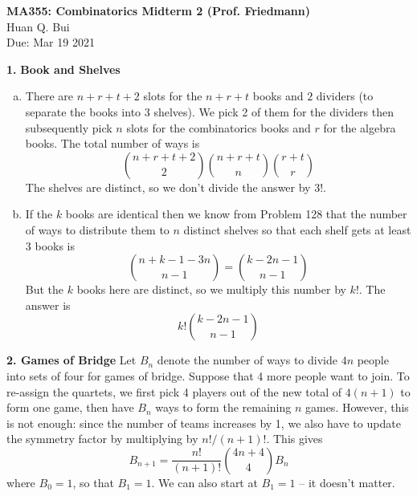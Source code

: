 \documentclass[11pt]{article}
\newcommand{\f}[2]{\frac{#1}{#2}}
\begin{document}
	\begin{framed}
\begin{center}
{\large \bf MA355: Combinatorics Midterm 2 (Prof. Friedmann)}\\
{ Huan Q. Bui}\\
Due: Mar 19 2021
\end{center}
\end{framed}







\noindent \textbf{1.} \textbf{Book and Shelves}
\begin{enumerate}[(a)]
	\item There are $n+r+t+2$ slots for the $n+r+t$ books and $2$ dividers (to separate the books into 3 shelves). We pick 2 of them for the dividers then subsequently pick $n$ slots for the combinatorics books and $r$ for the algebra books. The total number of ways is
	\begin{equation*}
	\boxed{{ n+r+t+2\choose{2}} { n+r+t\choose{n} }{ r+t\choose{r} }}
	\end{equation*}
	The shelves are distinct, so we don't divide the answer by $3!$.
	
	\item If the $k$ books are identical then we know from Problem 128 that the number of ways to distribute them to $n$ distinct shelves so that each shelf gets at least 3 books is 
	\begin{equation*}
	{ n+k-1-3n \choose{n-1}} = { k-2n-1 \choose{n-1}}
	\end{equation*}
	But the $k$ books here are distinct, so we multiply this number by $k!$. The answer is 
	\begin{equation*}
	\boxed{k! { k-2n-1 \choose{n-1}}}
	\end{equation*}
	
\end{enumerate}




\newpage

\noindent \textbf{2. Games of Bridge} 
\noindent Let $B_n$ denote the number of ways to divide $4n$ people into sets of four for games of bridge. Suppose that 4 more people want to join. To re-assign the quartets, we first pick 4 players out of the new total of $4(n+1)$ to form one game, then have $B_n$ ways to form the remaining $n$ games. However, this is not enough: since the number of teams increases by 1, we also have to update the symmetry factor by multiplying by $n!/(n+1)!$. This gives
\begin{equation*}
\boxed{B_{n+1} = \f{n!}{(n+1)!}{4n+4 \choose 4} B_n}
\end{equation*} 
where $B_0 = 1$, so that $B_1 = 1$. We can also start at $B_1=1$ -- it doesn't matter. \\
\end{document}
